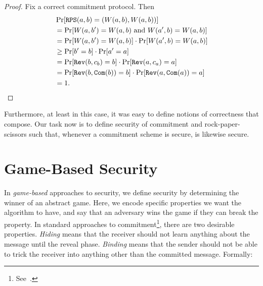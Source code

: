 \begin{proof}
	Fix a correct commitment protocol. Then \begin{align*}
		 & \Pr[{\texttt{RPS}}(a,b) = (W(a,b),W(a,b))]                                     \\
		 & = \Pr[W(a,b') = W(a,b)\text{ and }W(a',b) = W(a,b)]                       \\
		 & = \Pr[W(a,b') = W(a,b)]\cdot\Pr[W(a',b) = W(a,b)]                         \\
		 & \geq \Pr[b'=b]\cdot\Pr[a'=a]                                              \\
		 & = \Pr[{\texttt{Rev}}(b,c_b)=b]\cdot\Pr[{\texttt{Rev}}(a, c_a) = a]                  \\
		 & = \Pr[{\texttt{Rev}}(b,{\texttt{Com}}(b))=b]\cdot\Pr[{\texttt{Rev}}(a,{\texttt{Com}}(a)) = a] \\
		 & = 1.\qedhere
	\end{align*}
\end{proof}

\noindent
Furthermore, at least in this case, it was easy to define notions of correctness
that compose. Our task now is to define security of commitment and
rock-paper-scissors such that, whenever a commitment scheme is secure,
 is likewise secure.

\section{Game-Based Security}

In \emph{game-based} approaches to security, we define security by determining
the winner of an abstract game. Here, we encode specific properties we want the
algorithm to have, and say that an adversary wins the game if they can break the
property. In standard approaches to
commitment\footnote{See~\cites[Section 4.4.1]{goldreich-2001}.}, there are two
desirable properties. \emph{Hiding} means that the receiver should not learn
anything about the message until the reveal phase. \emph{Binding} means that the
sender should not be able to trick the receiver into anything other than the
committed message. Formally:

